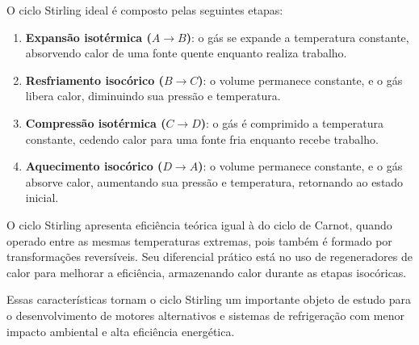 \documentclass[a4paper,12pt]{article}
\begin{document}
O ciclo Stirling ideal é composto pelas seguintes etapas:

\begin{enumerate}
    \item \colorbox{green!30}{\textbf{Expansão isotérmica (\(A \to B\))}}: o gás se expande a temperatura constante, absorvendo calor de uma fonte quente enquanto realiza trabalho.
    \item \colorbox{green!30}{\textbf{Resfriamento isocórico (\(B \to C\))}}: o volume permanece constante, e o gás libera calor, diminuindo sua pressão e temperatura.
    \item \colorbox{green!30}{\textbf{Compressão isotérmica (\(C \to D\))}}: o gás é comprimido a temperatura constante, cedendo calor para uma fonte fria enquanto recebe trabalho.
    \item \colorbox{green!30}{\textbf{Aquecimento isocórico (\(D \to A\))}}: o volume permanece constante, e o gás absorve calor, aumentando sua pressão e temperatura, retornando ao estado inicial.
\end{enumerate}

O \colorbox{green!30}{ciclo Stirling apresenta eficiência teórica igual à do ciclo de Carnot}, quando operado entre as mesmas temperaturas extremas, pois também é formado por transformações reversíveis. Seu diferencial prático está no uso de regeneradores de calor para melhorar a eficiência, armazenando calor durante as etapas isocóricas.

\bigskip

Essas características tornam o ciclo Stirling um importante objeto de estudo para o desenvolvimento de motores alternativos e sistemas de refrigeração com menor impacto ambiental e alta eficiência energética.
\end{document}
